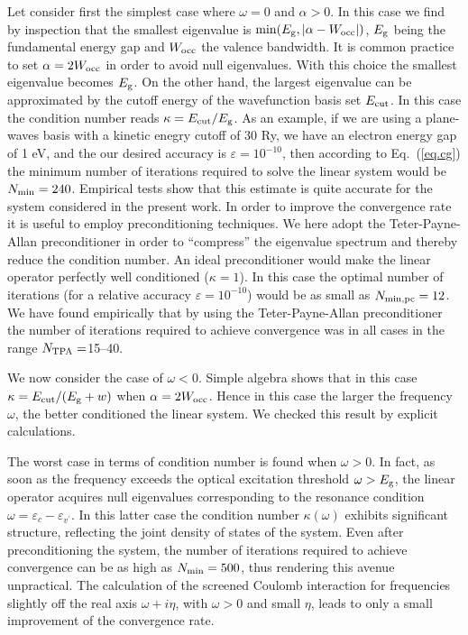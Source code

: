 \documentclass[twocolumn,prb,showpacs,superscriptaddress]{revtex4}
\def\w{\omega}
\def\E{\varepsilon}
\def\vp{{v^\prime}}
\begin{document}
Let consider first the simplest case where $\w=0$ and $\alpha>0$. In this case 
we find by inspection that the smallest eigenvalue is $\min(E_{\rm g}, |\alpha-W_{\rm occ}|)$, 
$E_{\rm g}$ being the fundamental energy gap and $W_{\rm occ}$ the valence bandwidth.
It is common practice to set $\alpha=2W_{\rm occ}$ in order to avoid null eigenvalues.
\cite{baroni.rmp} With this choice the smallest eigenvalue becomes $E_{\rm g}$.
On the other hand, the largest eigenvalue can be approximated by the
cutoff energy of the wavefunction basis set $E_{\rm cut}$.
In this case the condition number reads $\kappa = E_{\rm cut}/E_{\rm g}$.
As an example, if we are using a plane-waves basis with a kinetic enegry
cutoff of 30 Ry, we have an electron energy gap of 1 eV, 
and the our desired accuracy is $\varepsilon=10^{-10}$, then according to
Eq.\ (\ref{eq.cg}) the minimum number of iterations required to solve 
the linear system would be $N_{\rm min} = 240$. Empirical tests show that 
this estimate is quite accurate for the system considered in the present work.
In order to improve the convergence rate it is useful to employ preconditioning
techniques. We here adopt the Teter-Payne-Allan preconditioner\cite{tpa}
in order to ``compress'' the eigenvalue spectrum and thereby reduce the
condition number. An ideal preconditioner would make the linear operator
perfectly well conditioned ($\kappa=1$). In this case
the optimal  number of iterations (for a relative accuracy $\varepsilon=10^{-10}$) 
would be as small as $N_{\rm min,pc} = 12$. We have found empirically
that by using the Teter-Payne-Allan 
preconditioner the number of iterations
required to achieve convergence was in all cases in the range $N_{\rm TPA}=$15--40. 

We now consider the case of $\w<0$. Simple algebra shows that in this case
$\kappa = E_{\rm cut}/(E_{\rm g} + w)$
when $\alpha = 2W_{\rm occ}$. Hence in this case the larger the frequency $\w$,
the better conditioned the linear system. We checked this result
by explicit calculations.

The worst case in terms of condition number is found when $\w>0$. 
In fact, as soon as the frequency exceeds the optical excitation
threshold $\w>E_{\rm g}$, the linear operator acquires null eigenvalues 
corresponding to the resonance condition $\w = \E_c - \E_\vp$. 
In this latter case the condition
number $\kappa(\w)$ exhibits significant structure, reflecting
the joint density of states of the system. Even after preconditioning the system, 
the number of iterations required to achieve convergence can be as high as 
$N_{\rm min} = 500$, thus rendering this avenue unpractical.
The calculation of the screened Coulomb interaction for frequencies slightly
off the real axis $\w+i\eta$, with $\w>0$ and small $\eta$, leads to only a small
improvement of the convergence rate.
\end{document}
